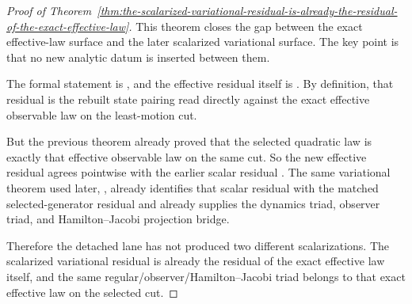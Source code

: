 \begin{proof}[Proof of Theorem~\ref{thm:the-scalarized-variational-residual-is-already-the-residual-of-the-exact-effective-law}]
\label{proof:thm:the-scalarized-variational-residual-is-already-the-residual-of-the-exact-effective-law}
This theorem closes the gap between the exact effective-law surface and the
later scalarized variational surface. The key point is that no new analytic
datum is inserted between them.

The formal statement is
,
and the effective residual itself is
. By definition, that residual is
the rebuilt state pairing read directly against the exact effective observable
law on the least-motion cut.

But the previous theorem already proved that the selected quadratic law is
exactly that effective observable law on the same cut. So the new effective
residual agrees pointwise with the earlier scalar residual
. The same variational theorem used later,
,
already identifies that scalar residual with the matched selected-generator
residual and already supplies the dynamics triad, observer triad, and
Hamilton--Jacobi projection bridge.

Therefore the detached lane has not produced two different scalarizations. The
scalarized variational residual is already the residual of the exact effective
law itself, and the same regular/observer/Hamilton--Jacobi triad belongs to
that exact effective law on the selected cut.
\end{proof}

